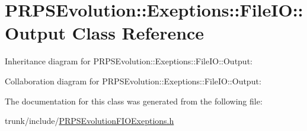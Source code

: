 \hypertarget{class_p_r_p_s_evolution_1_1_exeptions_1_1_file_i_o_1_1_output}{\section{P\-R\-P\-S\-Evolution\-:\-:Exeptions\-:\-:File\-I\-O\-:\-:Output Class Reference}
\label{class_p_r_p_s_evolution_1_1_exeptions_1_1_file_i_o_1_1_output}
}


Inheritance diagram for P\-R\-P\-S\-Evolution\-:\-:Exeptions\-:\-:File\-I\-O\-:\-:Output\-:


Collaboration diagram for P\-R\-P\-S\-Evolution\-:\-:Exeptions\-:\-:File\-I\-O\-:\-:Output\-:


The documentation for this class was generated from the following file\-:\begin{DoxyCompactItemize}
\item 
trunk/include/\hyperlink{_p_r_p_s_evolution_f_i_o_exeptions_8h}{P\-R\-P\-S\-Evolution\-F\-I\-O\-Exeptions.\-h}\end{DoxyCompactItemize}
